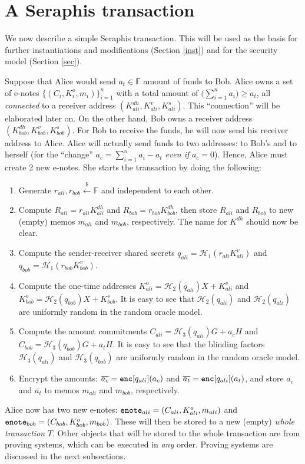 \documentclass{article}
\begin{document}
\section{A Seraphis transaction}\label{ser-tx}
We now describe a simple Seraphis transaction. This will be used as the basis for further instantiations and modifications (Section \ref{inst}) and for the security model (Section \ref{sec}).

Suppose that Alice would send $a_t\in\mathbb{F}$ amount of funds to Bob. Alice owns a set of e-notes $\{(C_i,K_i^o,m_i)\}_{i=1}^n$ with a total amount of $\big(\sum_{i=1}^{n}{a_i}\big)\ge a_t$, all \textit{connected} to a receiver address $(K_{ali}^{dh}, K_{ali}^v, K_{ali}^s)$. This ``connection'' will be elaborated later on. On the other hand, Bob owns a receiver address $(K_{bob}^{dh}, K_{bob}^v, K_{bob}^s)$. For Bob to receive the funds, he will now send his receiver address to Alice. Alice will actually send funds to two addresses: to Bob's and to herself (for the ``change'' $a_c = \sum_{i=1}^{n}{a_i} - a_t$ \textit{even if} $a_c=0$). Hence, Alice must create 2 new e-notes. She starts the transaction by doing the following:
\begin{enumerate}
    \item Generate $r_{ali}, r_{bob}\xleftarrow{\$}\mathbb{F}$ and independent to each other.
    \item Compute $R_{ali} = r_{ali}K_{ali}^{dh}$ and $R_{bob} = r_{bob}K_{bob}^{dh}$, then store $R_{ali}$ and $R_{bob}$ to new (empty) memos $m_{ali}$ and $m_{bob}$, respectively. The name for $K^{dh}$ should now be clear.
    \item Compute the sender-receiver shared secrets $q_{ali} = \mathcal{H}_1(r_{ali}K_{ali}^{v})$ and $q_{bob} = \mathcal{H}_1(r_{bob}K_{bob}^{v})$.
    \item Compute the one-time addresses $K_{ali}^o = \mathcal{H}_2(q_{ali})X + K_{ali}^s$ and $K_{bob}^o = \mathcal{H}_2(q_{bob})X + K_{bob}^s$. It is easy to see that $\mathcal{H}_2(q_{ali})$ and $\mathcal{H}_2(q_{ali})$ are uniformly random in the random oracle model.
    \item Compute the amount commitments $C_{ali} = \mathcal{H}_3(q_{ali})G + a_c H$ and $C_{bob} = \mathcal{H}_3(q_{bob})G + a_t H$. It is easy to see that the blinding factors $\mathcal{H}_3(q_{ali})$ and $\mathcal{H}_3(q_{bob})$ are uniformly random in the random oracle model.
    \item Encrypt the amounts: $\overline{a_c} = {\tt enc}[q_{ali}](a_c)$ and $\overline{a_t} = {\tt enc}[q_{ali}](a_t)$, and store $\overline{a_c}$ and $\overline{a_t}$ to memos $m_{ali}$ and $m_{bob}$, respectively.
\end{enumerate}
Alice now has two new e-notes: ${\tt enote}_{ali} = (C_{ali}, K_{ali}^o, m_{ali})$ and ${\tt enote}_{bob} = (C_{bob}, K_{bob}^o, m_{bob})$. These will then be stored to a new (empty) \textit{whole transaction} $T$. Other objects that will be stored to the whole transaction are from proving systems, which can be executed in \textit{any} order. Proving systems are discussed in the next subsections.
\end{document}
